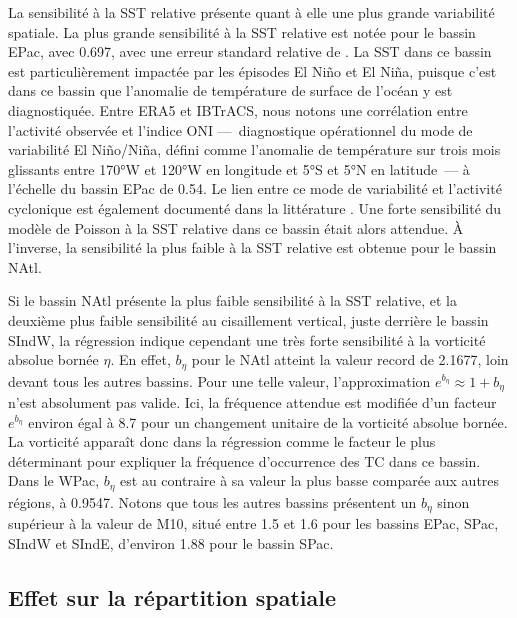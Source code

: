 \documentclass[../main.tex]{subfiles}
\begin{document}
La sensibilité à la SST relative présente quant à elle une plus grande variabilité spatiale. La plus grande sensibilité à la SST relative est notée pour le
bassin EPac, avec \num{0.697}, avec une erreur standard relative de . La SST dans ce bassin est particulièrement impactée par les épisodes El Niño et El
Niña, puisque c'est dans ce bassin que l'anomalie de température de surface de l'océan y est diagnostiquée. Entre ERA5 et IBTrACS, nous notons une corrélation
entre l'activité observée et l'indice ONI ---~diagnostique opérationnel du mode de variabilité El Niño/Niña, défini comme l'anomalie de température sur trois
mois glissants entre \ang{170}W et \ang{120}W en longitude et \ang{5}S et \ang{5}N en latitude~--- à l'échelle du bassin EPac de \num{0.54}. Le lien entre ce
mode de variabilité et l'activité cyclonique est également documenté dans la littérature \parencite{camargo_use_2007,lin_enso_2020}. Une forte
sensibilité du modèle de Poisson à la SST relative dans ce bassin était alors attendue. À l'inverse, la sensibilité la plus faible à la SST relative est obtenue
pour le bassin NAtl.

Si le bassin NAtl présente la plus faible sensibilité à la SST relative, et la deuxième plus faible sensibilité au cisaillement vertical, juste derrière le
bassin SIndW, la régression indique cependant une très forte sensibilité à la vorticité absolue bornée $\eta$. En effet, $b_\eta$ pour le NAtl atteint la valeur
record de \num{2.1677}, loin devant tous les autres bassins. Pour une telle valeur, l'approximation $e^{b_\eta} \approx 1 + b_\eta$ n'est absolument pas valide.
Ici, la fréquence attendue est modifiée d'un facteur $e^{b_\eta}$ environ égal à \num{8.7} pour un changement unitaire de la vorticité absolue bornée. La
vorticité apparaît donc dans la régression comme le facteur le plus déterminant pour expliquer la fréquence d'occurrence des TC dans ce bassin. Dans le WPac,
$b_\eta$ est au contraire à sa valeur la plus basse comparée aux autres régions, à \num{0.9547}. Notons que tous les autres bassins présentent un $b_\eta$ sinon
supérieur à la valeur de M10, situé entre \num{1.5} et \num{1.6} pour les bassins EPac, SPac, SIndW et SIndE, d'environ \num{1.88} pour le bassin SPac.

\subsection{Effet sur la répartition spatiale}\label{sec:lm10_effet_spatial}
\end{document}
